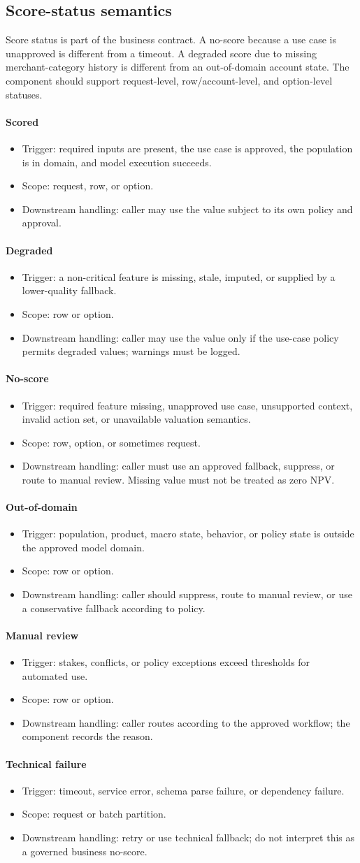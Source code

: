 \documentclass[11pt]{article}
\newcommand{\1}{\mathbf{1}}
\newcommand{\contractitem}[2]{\paragraph{#1}\begin{itemize}[leftmargin=1.5em,itemsep=0.12em,topsep=0.18em]#2\end{itemize}}
\begin{document}
\subsection{Score-status semantics}
\label{subsec:score-status}

Score status is part of the business contract. A no-score because a use case is
unapproved is different from a timeout. A degraded score due to missing
merchant-category history is different from an out-of-domain account state. The
component should support request-level, row/account-level, and option-level
statuses.

\contractitem{Scored}{
  \item Trigger: required inputs are present, the use case is approved, the
        population is in domain, and model execution succeeds.
  \item Scope: request, row, or option.
  \item Downstream handling: caller may use the value subject to its own policy
        and approval.
}
\contractitem{Degraded}{
  \item Trigger: a non-critical feature is missing, stale, imputed, or supplied
        by a lower-quality fallback.
  \item Scope: row or option.
  \item Downstream handling: caller may use the value only if the use-case
        policy permits degraded values; warnings must be logged.
}
\contractitem{No-score}{
  \item Trigger: required feature missing, unapproved use case, unsupported
        context, invalid action set, or unavailable valuation semantics.
  \item Scope: row, option, or sometimes request.
  \item Downstream handling: caller must use an approved fallback, suppress, or
        route to manual review. Missing value must not be treated as zero NPV.
}
\contractitem{Out-of-domain}{
  \item Trigger: population, product, macro state, behavior, or policy state is
        outside the approved model domain.
  \item Scope: row or option.
  \item Downstream handling: caller should suppress, route to manual review, or
        use a conservative fallback according to policy.
}
\contractitem{Manual review}{
  \item Trigger: stakes, conflicts, or policy exceptions exceed thresholds for
        automated use.
  \item Scope: row or option.
  \item Downstream handling: caller routes according to the approved workflow;
        the component records the reason.
}
\contractitem{Technical failure}{
  \item Trigger: timeout, service error, schema parse failure, or dependency
        failure.
  \item Scope: request or batch partition.
  \item Downstream handling: retry or use technical fallback; do not interpret
        this as a governed business no-score.
}
\end{document}
